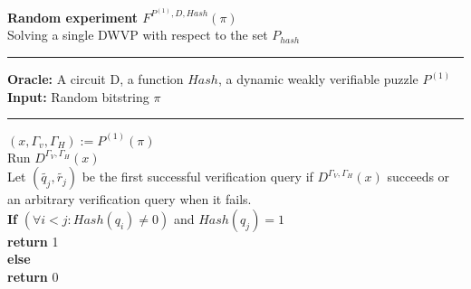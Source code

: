 \begin{codeblock}
  \textbf{Random experiment $F^{P^{(1)}, D, Hash}(\pi)$} \\
  Solving a single DWVP with respect to the set $P_{hash}$
  \medskip

  \hrule

  \medskip

  \textbf{Oracle:} A circuit D, a function $Hash$, a dynamic weakly verifiable puzzle $P^{(1)}$\\
  \textbf{Input:} Random bitstring $\pi$
  \medskip\hrule\medskip

  $(x, \Gamma_v, \Gamma_H) := P^{(1)}(\pi)$ \\
  Run $D^{\Gamma_V, \Gamma_H}(x)$ \\
  \IndI Let $(\widetilde{q_j},\widetilde{r_j})$ be the first successful verification query if $D^{\Gamma_V, \Gamma_H}(x)$ succeeds or \\
  \IndI an arbitrary verification query when it fails.\\
  \textbf{If} $(\forall i < j :  Hash(q_i) \neq 0 )$ and $Hash(q_j) = 1$ \\
  \IndI \textbf{return} 1\\
  \textbf{else}\\
  \IndI \textbf{return} 0\\

\end{codeblock}
%
%




